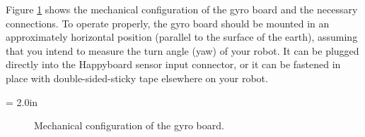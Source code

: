 Figure \ref{gyro1} shows the mechanical configuration of the gyro board and the
necessary connections.  To operate properly, the gyro board should be
mounted in an approximately horizontal position (parallel to the surface of the earth), 
assuming that you intend to measure the turn angle (yaw) of your robot.  It can be
plugged directly into the Happyboard sensor input connector, or it can be fastened in place 
with double-sided-sticky tape elsewhere on your robot.



\epsfysize = 2.0in
\begin{figure}[htp]
\begin{center}
\caption{Mechanical configuration of the gyro board.}
\label{gyro1}
\end{center}
\end{figure}
